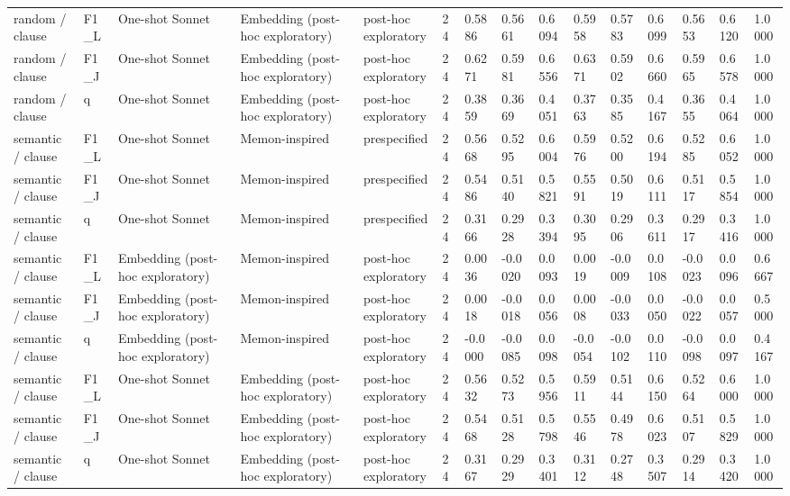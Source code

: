 \begin{table}[t]
{\begin{tabular}{lllllllllllllll}
random / clause & F1\_L & One-shot Sonnet & Embedding (post-hoc exploratory) & post-hoc exploratory & 24 & 0.5886 & 0.5661 & 0.6094 & 0.5958 & 0.5783 & 0.6099 & 0.5653 & 0.6120 & 1.0000 \\
random / clause & F1\_J & One-shot Sonnet & Embedding (post-hoc exploratory) & post-hoc exploratory & 24 & 0.6271 & 0.5981 & 0.6556 & 0.6371 & 0.5902 & 0.6660 & 0.5965 & 0.6578 & 1.0000 \\
random / clause & q & One-shot Sonnet & Embedding (post-hoc exploratory) & post-hoc exploratory & 24 & 0.3859 & 0.3669 & 0.4051 & 0.3763 & 0.3585 & 0.4167 & 0.3655 & 0.4064 & 1.0000 \\
semantic / clause & F1\_L & One-shot Sonnet & Memon-inspired & prespecified & 24 & 0.5668 & 0.5295 & 0.6004 & 0.5976 & 0.5200 & 0.6194 & 0.5285 & 0.6052 & 1.0000 \\
semantic / clause & F1\_J & One-shot Sonnet & Memon-inspired & prespecified & 24 & 0.5486 & 0.5140 & 0.5821 & 0.5591 & 0.5019 & 0.6111 & 0.5117 & 0.5854 & 1.0000 \\
semantic / clause & q & One-shot Sonnet & Memon-inspired & prespecified & 24 & 0.3166 & 0.2928 & 0.3394 & 0.3095 & 0.2906 & 0.3611 & 0.2917 & 0.3416 & 1.0000 \\
semantic / clause & F1\_L & Embedding (post-hoc exploratory) & Memon-inspired & post-hoc exploratory & 24 & 0.0036 & -0.0020 & 0.0093 & 0.0019 & -0.0009 & 0.0108 & -0.0023 & 0.0096 & 0.6667 \\
semantic / clause & F1\_J & Embedding (post-hoc exploratory) & Memon-inspired & post-hoc exploratory & 24 & 0.0018 & -0.0018 & 0.0056 & 0.0008 & -0.0033 & 0.0050 & -0.0022 & 0.0057 & 0.5000 \\
semantic / clause & q & Embedding (post-hoc exploratory) & Memon-inspired & post-hoc exploratory & 24 & -0.0000 & -0.0085 & 0.0098 & -0.0054 & -0.0102 & 0.0110 & -0.0098 & 0.0097 & 0.4167 \\
semantic / clause & F1\_L & One-shot Sonnet & Embedding (post-hoc exploratory) & post-hoc exploratory & 24 & 0.5632 & 0.5273 & 0.5956 & 0.5911 & 0.5144 & 0.6150 & 0.5264 & 0.6000 & 1.0000 \\
semantic / clause & F1\_J & One-shot Sonnet & Embedding (post-hoc exploratory) & post-hoc exploratory & 24 & 0.5468 & 0.5128 & 0.5798 & 0.5546 & 0.4978 & 0.6023 & 0.5107 & 0.5829 & 1.0000 \\
semantic / clause & q & One-shot Sonnet & Embedding (post-hoc exploratory) & post-hoc exploratory & 24 & 0.3167 & 0.2929 & 0.3401 & 0.3112 & 0.2748 & 0.3507 & 0.2914 & 0.3420 & 1.0000 \\

\end{tabular}}
\end{table}
